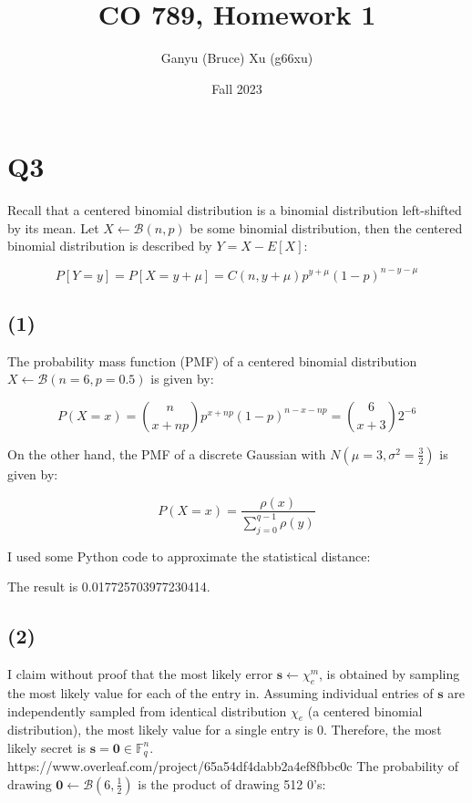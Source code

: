 \documentclass{article}
\title{CO 789, Homework 1}
\author{Ganyu (Bruce) Xu (g66xu)}
\date{Fall 2023}
\begin{document}

\section*{Q3}
Recall that a centered binomial distribution is a binomial distribution left-shifted by its mean. Let $X \leftarrow \mathcal{B}(n, p)$ be some binomial distribution, then the centered binomial distribution is described by $Y = X - E[X]$:

$$
P[Y=y] = P[X = y + \mu] = C(n, y + \mu)p^{y + \mu}(1-p)^{n - y - \mu}
$$

\subsection*{(1)}
The probability mass function (PMF) of a centered binomial distribution $X \leftarrow \mathcal{B}(n=6, p=0.5)$ is given by:

$$
P(X=x) = \binom{n}{x + np}p^{x + np}(1-p)^{n - x - np} = \binom{6}{x + 3}2^{-6}
$$

On the other hand, the PMF of a discrete Gaussian with $N(\mu=3, \sigma^2=\frac{3}{2})$ is given by:

$$
P(X=x) = \frac{\rho(x)}{\sum_{j=0}^{q-1}\rho(y)}
$$

I used some Python code to approximate the statistical distance:



The result is {0.017725703977230414}.

\subsection*{(2)}
I claim without proof that the most likely error $\mathbf{s} \leftarrow \chi_e^m$, is obtained by sampling the most likely value for each of the entry in. Assuming individual entries of $\mathbf{s}$ are independently sampled from identical distribution $\chi_e$ (a centered binomial distribution), the most likely value for a single entry is $0$. Therefore, the most likely secret is $\mathbf{s} = \mathbf{0} \in \mathbb{F}_q^n$.
https://www.overleaf.com/project/65a54df4dabb2a4ef8fbbc0c
The probability of drawing $\mathbf{0} \leftarrow \mathcal{B}(6, \frac{1}{2})$ is the product of drawing 512 $0$'s:
\end{document}
